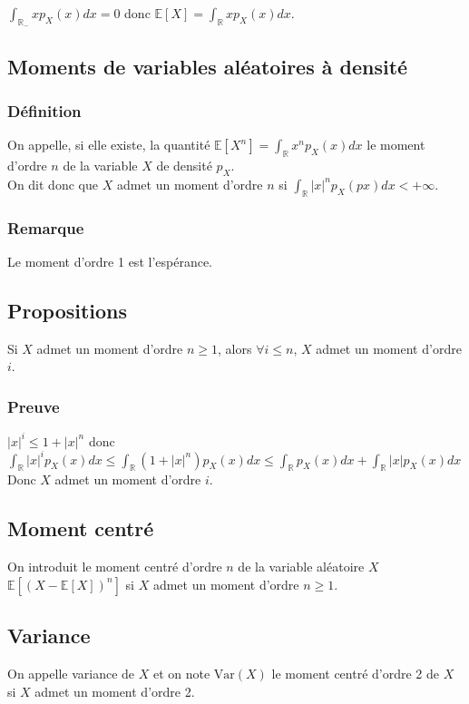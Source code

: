 \documentclass[a4paper,10pt]{book} %
\newcommand{\R}{\mathbb{R}}
\newcommand{\E}{\mathbb{E}} %
\newcommand\abs[1]{\left|#1\right|}
\newcommand{\Var}{\mathrm{Var}} %
\begin{document}
$\displaystyle \int_{\R_-}xp_X(x)dx=0$ donc $\E[X]=\displaystyle \int_\R xp_X(x)dx$.

\subsection{Moments de variables aléatoires à densité}
\subsubsection{Définition}
On appelle, si elle existe, la quantité $\displaystyle \E[X^n]=\int_\R x^n p_X(x)dx$ le moment d'ordre $n$ de la variable $X$ de densité $p_X$.\\

On dit donc que $X$ admet un moment d'ordre $n$ si $\displaystyle \int_\R \abs{x}^np_X(px)dx < +\infty$.

\subsubsection{Remarque}
Le moment d'ordre 1 est l'espérance.

\subsection{Propositions}
Si $X$ admet un moment d'ordre $n \geq 1$, alors $\forall i \leq n$, $X$ admet un moment d'ordre $i$.

\subsubsection{Preuve}
$\displaystyle \abs{x}^i\leq 1 +\abs{x}^n$ donc $\displaystyle \int_\R \abs{x}^i p_X(x)dx \leq \int_\R(1+\abs{x}^n)p_X(x)dx \leq \int_\R p_X(x)dx + \int_\R \abs{x}p_X(x)dx$\\
Donc $X$ admet un moment d'ordre $i$.

\subsection{Moment centré}
On introduit le moment centré d'ordre $n$ de la variable aléatoire $X$ $\E[(X-\E[X])^n]$ si $X$ admet un moment d'ordre $n\geq 1$.

\subsection{Variance}
On appelle variance de $X$ et on note $\Var(X)$ le moment centré d'ordre 2 de $X$ si $X$ admet un moment d'ordre 2.\\
\end{document}
